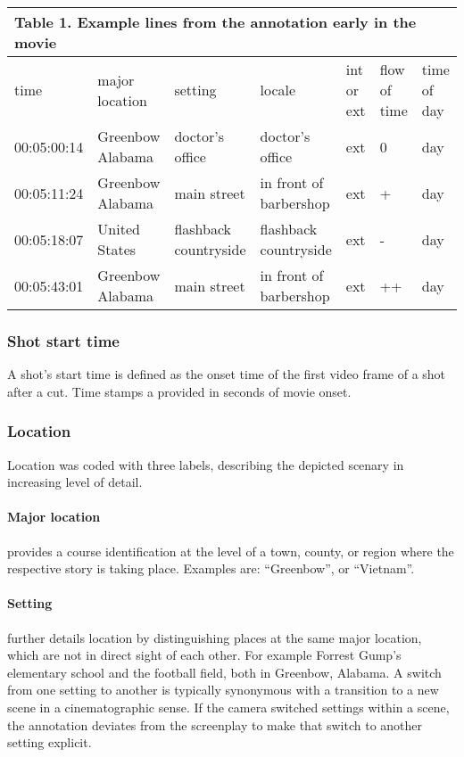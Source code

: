 \documentclass[10pt,a4paper,twocolumn]{article}
\begin{document}
\begin{table}[h]
\begin{tabular}{lllllll}
\multicolumn{7}{l}{Table 1. Example lines from the annotation early in the movie}\tabularnewline
\hline 
time & major location & setting & locale & int or ext & flow of time & time of day\tabularnewline
00:05:00:14  & Greenbow Alabama  & doctor's office  & doctor's office  & ext  & 0 & day\tabularnewline
00:05:11:24  & Greenbow Alabama  & main street  & in front of barbershop  & ext  & + & day\tabularnewline
00:05:18:07  & United States  & flashback countryside  & flashback countryside  & ext  & - & day\tabularnewline
00:05:43:01 & Greenbow Alabama  & main street  & in front of barbershop  & ext  & ++ & day\tabularnewline
\hline 
\end{tabular}
\end{table}



\subsubsection*{Shot start time}

A shot's start time is defined as the onset time of the first video frame of a
shot after a cut. Time stamps a provided in seconds of movie onset. 

\subsubsection*{Location}

Location was coded with three labels, describing the depicted scenary
in increasing level of detail.

\paragraph{Major location} provides a course identification at the level of a
town, county, or region where the respective story is taking place. Examples are:
``Greenbow'', or ``Vietnam''.

\paragraph{Setting} further details location by distinguishing places at the same
major location, which are not in direct sight of each other. For example
Forrest Gump's elementary school and the football field, both in Greenbow,
Alabama. A switch from one setting to another is typically synonymous with a
transition to a new scene in a cinematographic sense. If the camera switched 
settings within a scene, the annotation deviates from the screenplay to make that
switch to another setting explicit.
\end{document}
